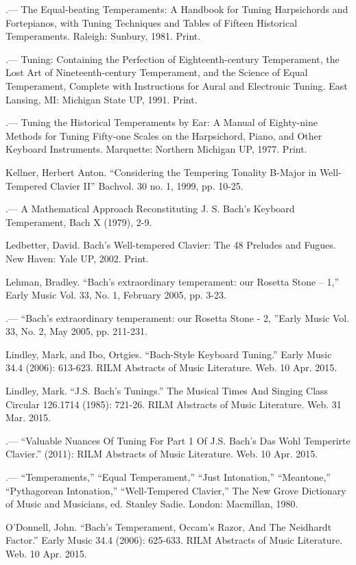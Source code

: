 \begin{hangparas}{0.5in}{1}
.--- The Equal-beating Temperaments: A Handbook for Tuning Harpsichords and Fortepianos, with Tuning Techniques and Tables of Fifteen Historical Temperaments. Raleigh: Sunbury, 1981. Print.

.--- Tuning: Containing the Perfection of Eighteenth-century Temperament, the Lost Art of Nineteenth-century Temperament, and the Science of Equal Temperament, Complete with Instructions for Aural and Electronic Tuning.  East Lansing, MI: Michigan State UP, 1991. Print.

.--- Tuning the Historical Temperaments by Ear: A Manual of Eighty-nine Methods for Tuning Fifty-one Scales on the Harpsichord, Piano, and Other Keyboard Instruments. Marquette: Northern Michigan UP, 1977. Print.

Kellner, Herbert Anton. ``Considering the Tempering Tonality B-Major in Well- Tempered Clavier II'' Bachvol. 30 no. 1, 1999, pp. 10-25.

.--- A Mathematical Approach Reconstituting J. S. Bach's Keyboard Temperament, Bach X (1979), 2-9.

Ledbetter, David. Bach's Well-tempered Clavier: The 48 Preludes and Fugues. New Haven: Yale UP, 2002. Print.

Lehman, Bradley. ``Bach's extraordinary temperament: our Rosetta Stone -- 1,'' Early Music Vol. 33, No. 1, February 2005, pp. 3-23.

.--- ``Bach's extraordinary temperament: our Rosetta Stone - 2, ''Early Music Vol. 33, No. 2, May 2005, pp. 211-231.

Lindley, Mark, and Ibo, Ortgies. ``Bach-Style Keyboard Tuning.'' Early Music 34.4 (2006): 613-623. RILM Abstracts of Music Literature. Web. 10 Apr. 2015.

Lindley, Mark. ``J.S. Bach's Tunings.'' The Musical Times And Singing Class Circular 126.1714 (1985): 721-26. RILM Abstracts of Music Literature.  Web. 31 Mar. 2015.

.--- ``Valuable Nuances Of Tuning For Part 1 Of J.S. Bach's Das Wohl Temperirte Clavier.'' (2011): RILM Abstracts of Music Literature. Web. 10 Apr. 2015.

.--- ``Temperaments,'' ``Equal Temperament,'' ``Just Intonation,'' ``Meantone,'' ``Pythagorean Intonation,'' ``Well-Tempered Clavier,'' The New Grove Dictionary of Music and Musicians, ed. Stanley Sadie. London: Macmillan, 1980.

O'Donnell, John. ``Bach's Temperament, Occam's Razor, And The Neidhardt Factor.'' Early Music 34.4 (2006): 625-633. RILM Abstracts of Music Literature.  Web. 10 Apr. 2015.


\end{hangparas}
